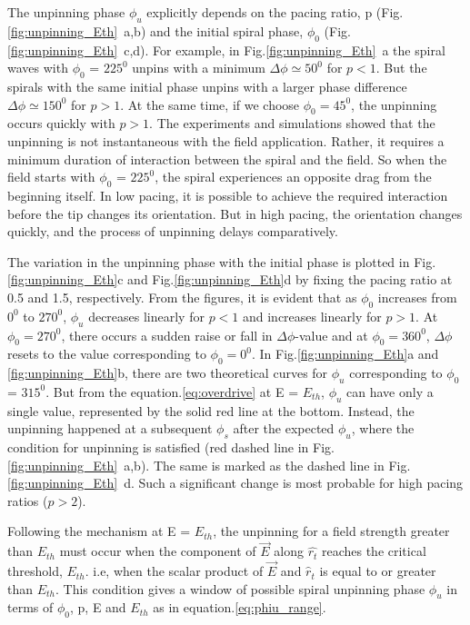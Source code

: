 \documentclass[%
 preprint,
 amsmath,amssymb,
 aps,
]{revtex4-2}
\begin{document}
The unpinning phase $\phi_{u}$ explicitly depends on the pacing ratio, p (Fig.\ref{fig:unpinning_Eth}~a,b) and the initial spiral phase, $\phi_{0}$ (Fig.\ref{fig:unpinning_Eth}~c,d). For example, in Fig.\ref{fig:unpinning_Eth}~a the spiral waves with $\phi_{0}$ = $225^0$ unpins with a minimum $\Delta\phi \simeq 50^0$ for $p<1$. %
But the spirals with the same initial phase unpins with a larger phase difference $\Delta\phi \simeq 150^0$ for $p>1$. At the same time, if we choose $\phi_{0} = 45^0$, the unpinning occurs quickly with $p>1$. 
The experiments and simulations showed that the unpinning is not instantaneous with the field application. Rather, it requires a minimum duration of interaction between the spiral and the field. So when the field starts with $\phi_{0}$ = $225^0$, the spiral experiences an opposite drag from the beginning itself. In low pacing, it is possible to achieve the required interaction before the tip changes its orientation. But in high pacing, the orientation changes quickly, and the process of unpinning delays comparatively. 

The variation in the unpinning phase with the initial phase is plotted in Fig.\ref{fig:unpinning_Eth}c and Fig.\ref{fig:unpinning_Eth}d by fixing the pacing ratio at 0.5 and 1.5, respectively. From the figures, it is evident that as $\phi_0$ increases from $0^0$ to $270^0$, $\phi_{u}$ decreases linearly for $p<1$ and increases linearly for $p>1$. At $\phi_{0} = 270^0$, there occurs a sudden raise or fall in $\Delta\phi$-value and at $\phi_{0} = 360^0$, $\Delta\phi$ resets to the value corresponding to $\phi_{0} = 0^0$. In Fig.\ref{fig:unpinning_Eth}a and \ref{fig:unpinning_Eth}b, there are two theoretical curves for $\phi_{u}$ corresponding to $\phi_{0}$ = $315^0$. But from the equation.\ref{eq:overdrive} at E = $E_{th}$, $\phi_{u}$ can have only a single value, represented by the solid red line at the bottom. Instead, the unpinning happened at a subsequent $\phi_{s}$ after the expected $\phi_{u}$, where the condition for unpinning is satisfied (red dashed line in Fig.\ref{fig:unpinning_Eth}~a,b). The same is marked as the dashed line in Fig.\ref{fig:unpinning_Eth}~d. Such a significant change is most probable for high pacing ratios ($p>2$). 




Following the mechanism at E = $E_{th}$, the unpinning for a field strength greater than $E_{th}$ must occur when the component of $\vec{E}$ along $\hat{r_t}$ reaches the critical threshold, $E_{th}$. i.e, when the scalar product of ${\vec{E}}$ and ${\hat{r}}_{t}$ is equal to or greater than $E_{th}$. This condition gives a window of possible spiral unpinning phase $\phi_{u}$ in terms of $\phi_{0}$, p, E and $E_{th}$ as in equation.\ref{eq:phiu_range}.
\end{document}
